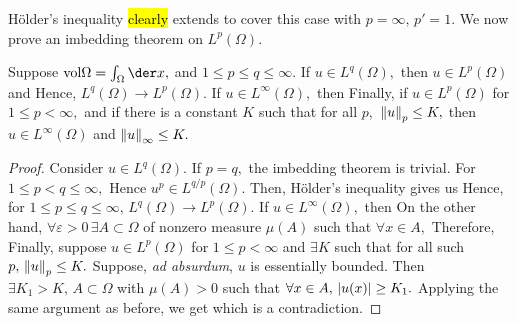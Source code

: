 H\"older's inequality \hl{clearly} extends to cover this case with $p=\infty,\,p'=1.$ We now prove an imbedding theorem on $L^p(\Omega).$
\begin{theorem}
    Suppose $\mathrm{vol}\Omega=\int_\Omega\der x,$ and $1\leq p\leq q\leq\infty.$ If $u\in L^q(\Omega),$ then $u\in L^p(\Omega)$ and
    Hence, $L^q(\Omega)\rightarrow L^p(\Omega).$ If $u\in L^\infty(\Omega),$ then
    Finally, if $u\in L^p(\Omega)$ for $1\leq p <\infty,$ and if there is a constant $K$ such that for all $p,$ $\norm{u}_p\leq K,$ then $u\in L^\infty(\Omega)$ and $\norm{u}_\infty\leq K.$
\end{theorem}
\begin{proof}
    Consider $u\in L^q(\Omega).$ If $p=q,$ the imbedding theorem is trivial. For $1\leq p < q \leq \infty,$
    Hence $u^{p}\in L^{q/p}(\Omega).$ Then, H\"older's inequality gives us
    Hence, for $1\leq p \leq q\leq\infty,\,L^q(\Omega)\rightarrow L^p(\Omega).$ If $u\in L^\infty(\Omega),$ then
    On the other hand, $\forall\varepsilon>0\,\exists A\subset\Omega$ of nonzero measure $\mu(A)$ such that $\forall x\in A,$
    Therefore,
    Finally, suppose $u\in L^p(\Omega)$ for $1\leq p< \infty$ and $\exists K$ such that for all such $p,\, \norm{u}_p\leq K.$ Suppose, \textit{ad absurdum}, $u$ is essentially bounded. Then $\exists K_1>K,\,A\subset\Omega$ with $\mu(A)>0$ such that $\forall x\in A,\,\abs{u(x)}\geq K_1.$ Applying the same argument as before, we get
    which is a contradiction.
\end{proof}
